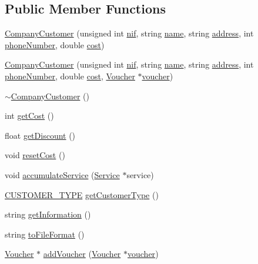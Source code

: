\subsection*{Public Member Functions}
\begin{DoxyCompactItemize}
\item 
\hyperlink{classCompanyCustomer_a525a581a4b955657234bab5761ae2f02}{Company\+Customer} (unsigned int \hyperlink{classCustomer_a65ad3329532d5ad31e36f4ac81858e31}{nif}, string \hyperlink{classCustomer_a42c1c948fa0121c82b2725826d9f8300}{name}, string \hyperlink{classCustomer_a72d87951c1b76883390d00baf044cf2c}{address}, int \hyperlink{classCustomer_ad8c8d99b4c35f66a1a87b234c6078e0f}{phone\+Number}, double \hyperlink{classCompanyCustomer_a69dd60239a6ccfef6c444e64975fb5d7}{cost})
\item 
\hyperlink{classCompanyCustomer_af95c687f20e167f7df7e6fcee1493e7f}{Company\+Customer} (unsigned int \hyperlink{classCustomer_a65ad3329532d5ad31e36f4ac81858e31}{nif}, string \hyperlink{classCustomer_a42c1c948fa0121c82b2725826d9f8300}{name}, string \hyperlink{classCustomer_a72d87951c1b76883390d00baf044cf2c}{address}, int \hyperlink{classCustomer_ad8c8d99b4c35f66a1a87b234c6078e0f}{phone\+Number}, double \hyperlink{classCompanyCustomer_a69dd60239a6ccfef6c444e64975fb5d7}{cost}, \hyperlink{classVoucher}{Voucher} $\ast$\hyperlink{classCompanyCustomer_a19915d197c698ef79c608a6ca1f178fe}{voucher})
\item 
\hyperlink{classCompanyCustomer_afd96d1b12bbaf07317777b0736eb1d3f}{$\sim$\+Company\+Customer} ()
\item 
int \hyperlink{classCompanyCustomer_a4552ae519d7ba549979d7f67cfdec3fb}{get\+Cost} ()
\item 
float \hyperlink{classCompanyCustomer_aa9af04558e4c90df0c2379456ae7b626}{get\+Discount} ()
\item 
void \hyperlink{classCompanyCustomer_a20935ee3df903d3933c74e8bc2148402}{reset\+Cost} ()
\item 
void \hyperlink{classCompanyCustomer_a904197ef9475d4309ac41cc54a2ae5a3}{accumulate\+Service} (\hyperlink{classService}{Service} $\ast$service)
\item 
\hyperlink{classCustomer_adf157cb713398bb38163743659ec3049}{C\+U\+S\+T\+O\+M\+E\+R\+\_\+\+T\+Y\+PE} \hyperlink{classCompanyCustomer_a29b36593a5cc93f3c6d9f9372b261bba}{get\+Customer\+Type} ()
\item 
string \hyperlink{classCompanyCustomer_a43dcc60f21c2b48e4af587314653d94d}{get\+Information} ()
\item 
string \hyperlink{classCompanyCustomer_aae3bd828d590b136e6ca407ef6f47350}{to\+File\+Format} ()
\item 
\hyperlink{classVoucher}{Voucher} $\ast$ \hyperlink{classCompanyCustomer_a8cac3004028091378a2edb5cc211f1c8}{add\+Voucher} (\hyperlink{classVoucher}{Voucher} $\ast$\hyperlink{classCompanyCustomer_a19915d197c698ef79c608a6ca1f178fe}{voucher})
\end{DoxyCompactItemize}
